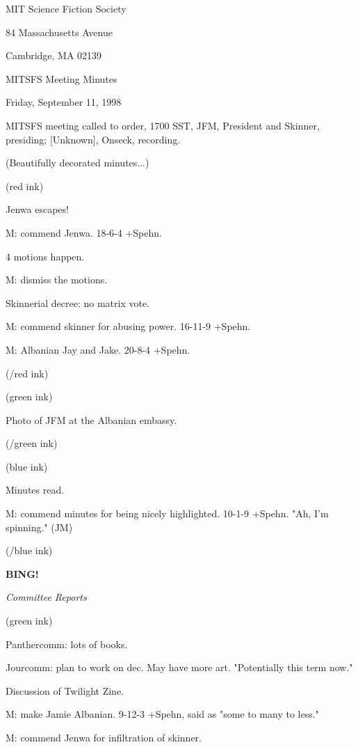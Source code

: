 \documentclass[12pt]{article}
\newcommand{\bing}{{\bf BING!} }
\newcommand{\goto}[1]{\bing \vskip 12pt \centerline{{\em{#1}}}}
\begin{document}
\begin{center}

MIT Science Fiction Society 

84 Massachusetts Avenue

Cambridge, MA 02139

\vspace{12pt}

MITSFS Meeting Minutes 

Friday, September 11, 1998

\end{center}
 
\vspace{18pt}

\setlength{\parskip}{6pt}

\noindent
MITSFS meeting called to order, 1700 SST,
JFM, President and Skinner, presiding; [Unknown], Onseck, recording.

(Beautifully decorated minutes...)

(red ink)

Jenwa escapes!

M: commend Jenwa. 18-6-4 +Spehn.

4 motions happen.

M: dismiss the motions.

Skinnerial decree: no matrix vote.

M: commend skinner for abusing power. 16-11-9 +Spehn.

M: Albanian Jay and Jake. 20-8-4 +Spehn.

(/red ink)

(green ink)

Photo of JFM at the Albanian embassy.

(/green ink)

(blue ink)

Minutes read.

M: commend minutes for being nicely highlighted. 10-1-9 +Spehn. "Ah, I'm spinning." (JM)

(/blue ink)

\goto{Committee Reports}

(green ink)

Panthercomm: lots of books.

Jourcomm: plan to work on dec. May have more art. "Potentially this term now."

Discussion of Twilight Zine.

M: make Jamie Albanian. 9-12-3 +Spehn, said as "some to many to less."

M: commend Jenwa for infiltration of skinner.
\end{document}
